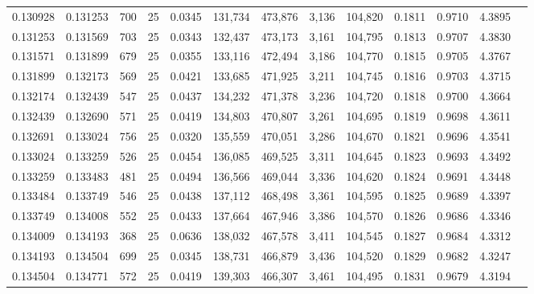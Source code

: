 \begin{tabular}{rrrrrrrrrrrrr}
0.130928 & 0.131253 &   700 &  25 &                                     0.0345 & 131,734 & 473,876 &   3,136 & 104,820 & 0.1811 & 0.9710 & 4.3895 \\
0.131253 & 0.131569 &   703 &  25 &                                     0.0343 & 132,437 & 473,173 &   3,161 & 104,795 & 0.1813 & 0.9707 & 4.3830 \\
0.131571 & 0.131899 &   679 &  25 &                                     0.0355 & 133,116 & 472,494 &   3,186 & 104,770 & 0.1815 & 0.9705 & 4.3767 \\
0.131899 & 0.132173 &   569 &  25 &                                     0.0421 & 133,685 & 471,925 &   3,211 & 104,745 & 0.1816 & 0.9703 & 4.3715 \\
0.132174 & 0.132439 &   547 &  25 &                                     0.0437 & 134,232 & 471,378 &   3,236 & 104,720 & 0.1818 & 0.9700 & 4.3664 \\
0.132439 & 0.132690 &   571 &  25 &                                     0.0419 & 134,803 & 470,807 &   3,261 & 104,695 & 0.1819 & 0.9698 & 4.3611 \\
0.132691 & 0.133024 &   756 &  25 &                                     0.0320 & 135,559 & 470,051 &   3,286 & 104,670 & 0.1821 & 0.9696 & 4.3541 \\
0.133024 & 0.133259 &   526 &  25 &                                     0.0454 & 136,085 & 469,525 &   3,311 & 104,645 & 0.1823 & 0.9693 & 4.3492 \\
0.133259 & 0.133483 &   481 &  25 &                                     0.0494 & 136,566 & 469,044 &   3,336 & 104,620 & 0.1824 & 0.9691 & 4.3448 \\
0.133484 & 0.133749 &   546 &  25 &                                     0.0438 & 137,112 & 468,498 &   3,361 & 104,595 & 0.1825 & 0.9689 & 4.3397 \\
0.133749 & 0.134008 &   552 &  25 &                                     0.0433 & 137,664 & 467,946 &   3,386 & 104,570 & 0.1826 & 0.9686 & 4.3346 \\
0.134009 & 0.134193 &   368 &  25 &                                     0.0636 & 138,032 & 467,578 &   3,411 & 104,545 & 0.1827 & 0.9684 & 4.3312 \\
0.134193 & 0.134504 &   699 &  25 &                                     0.0345 & 138,731 & 466,879 &   3,436 & 104,520 & 0.1829 & 0.9682 & 4.3247 \\
0.134504 & 0.134771 &   572 &  25 &                                     0.0419 & 139,303 & 466,307 &   3,461 & 104,495 & 0.1831 & 0.9679 & 4.3194 \\

\end{tabular}

